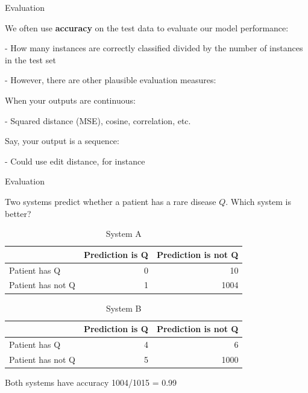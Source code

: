 \documentclass[12pt]{beamer}
\begin{document}
\begin{frame}{Evaluation}
	
	
We often use \textbf{accuracy} on the test data to evaluate our model performance:

- How many instances are correctly classified divided by the number of instances in the test set
	
- However, there are other plausible evaluation	measures:
	
When your outputs are continuous:

- Squared distance (MSE), cosine, correlation, etc.
	
Say, your output is a sequence:

- Could use edit distance, for instance
	
\end{frame}

\begin{frame}{Evaluation}

Two systems predict whether a patient has a rare disease $Q$. Which system is better?

\begin{table}
	\begin{footnotesize}
		\begin{tabular}{l|rr}
			& Prediction is Q & Prediction is not Q \\ \hline
			Patient has Q & 0 & 10 \\
			Patient has not Q & 1 & 1004 \\
		\end{tabular}
	\end{footnotesize}
	\caption{System A}
\end{table}

\begin{table}
	\begin{footnotesize}
		\begin{tabular}{l|rr}
			& Prediction is Q & Prediction is not Q \\ \hline
			Patient has Q & 4 & 6 \\
			Patient has not Q & 5 & 1000 \\
		\end{tabular}
	\end{footnotesize}
	\caption{System B}
\end{table}

Both systems have accuracy 1004/1015 = 0.99
	
\end{frame}
\end{document}
